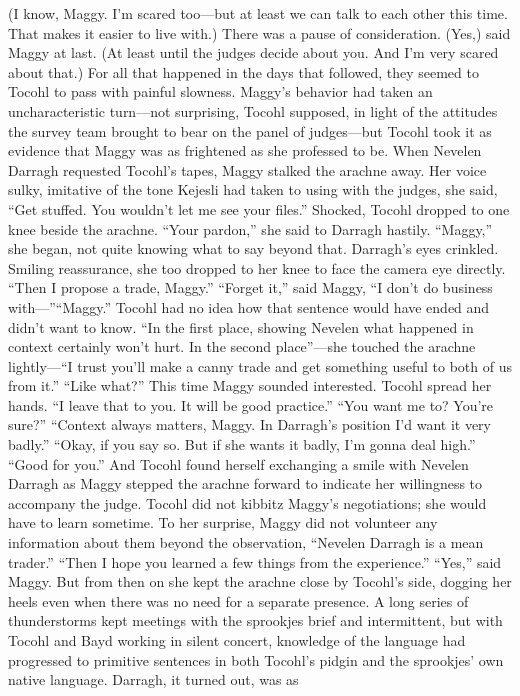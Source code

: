 \documentclass[9pt]{article}
\begin{document}
(I know, Maggy. I’m scared too—but at least we can talk to each other this time. That makes it
easier to live with.)
There was a pause of consideration. (Yes,) said Maggy at last. (At least until the judges decide about
you. And I’m very scared about that.)
For all that happened in the days that followed, they seemed to Tocohl to pass with painful slowness.
Maggy’s behavior had taken an uncharacteristic turn—not surprising, Tocohl supposed, in light of the
attitudes the survey team brought to bear on the panel of judges—but Tocohl took it as evidence that
Maggy was as frightened as she professed to be.
When Nevelen Darragh requested Tocohl’s tapes, Maggy stalked the arachne away. Her voice
sulky, imitative of the tone Kejesli had taken to using with the judges, she said, “Get stuffed. You
wouldn’t let me see your files.”
Shocked, Tocohl dropped to one knee beside the arachne. “Your pardon,” she said to Darragh
hastily. “Maggy,” she began, not quite knowing what to say beyond that.
Darragh’s eyes crinkled. Smiling reassurance, she too dropped to her knee to face the camera eye
directly. “Then I propose a trade, Maggy.”
“Forget it,” said Maggy, “I don’t do business with—”“Maggy.” Tocohl had no idea how that sentence would have ended and didn’t want to know. “In the
first place, showing Nevelen what happened in context certainly won’t hurt. In the second place”—she
touched the arachne lightly—“I trust you’ll make a canny trade and get something useful to both of us
from it.”
“Like what?” This time Maggy sounded interested.
Tocohl spread her hands. “I leave that to you. It will be good practice.”
“You want me to? You’re sure?”
“Context always matters, Maggy. In Darragh’s position I’d want it very badly.”
“Okay, if you say so. But if she wants it badly, I’m gonna deal high.”
“Good for you.” And Tocohl found herself exchanging a smile with Nevelen Darragh as Maggy
stepped the arachne forward to indicate her willingness to accompany the judge.
Tocohl did not kibbitz Maggy’s negotiations; she would have to learn sometime. To her surprise,
Maggy did not volunteer any information about them beyond the observation, “Nevelen Darragh is a
mean trader.”
“Then I hope you learned a few things from the experience.”
“Yes,” said Maggy. But from then on she kept the arachne close by Tocohl’s side, dogging her heels
even when there was no need for a separate presence.
A long series of thunderstorms kept meetings with the sprookjes brief and intermittent, but with
Tocohl and Bayd working in silent concert, knowledge of the language had progressed to primitive
sentences in both Tocohl’s pidgin and the sprookjes’ own native language. Darragh, it turned out, was as
\end{document}
